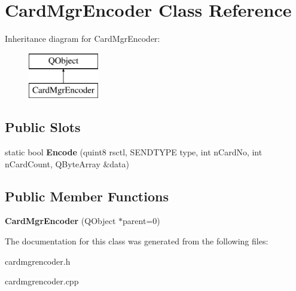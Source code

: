 \hypertarget{class_card_mgr_encoder}{\section{Card\-Mgr\-Encoder Class Reference}
\label{class_card_mgr_encoder}
}
Inheritance diagram for Card\-Mgr\-Encoder\-:\begin{figure}[H]
\begin{center}
\leavevmode
\includegraphics[height=2.000000cm]{class_card_mgr_encoder}
\end{center}
\end{figure}
\subsection*{Public Slots}
\begin{DoxyCompactItemize}
\item 
\hypertarget{class_card_mgr_encoder_a85a8efd0661a4f56c72ceca9a6aa505c}{static bool {\bfseries Encode} (quint8 rsctl, S\-E\-N\-D\-T\-Y\-P\-E type, int n\-Card\-No, int n\-Card\-Count, Q\-Byte\-Array \&data)}\label{class_card_mgr_encoder_a85a8efd0661a4f56c72ceca9a6aa505c}

\end{DoxyCompactItemize}
\subsection*{Public Member Functions}
\begin{DoxyCompactItemize}
\item 
\hypertarget{class_card_mgr_encoder_a76744be609a1f9b2c01d4401f6e2de41}{{\bfseries Card\-Mgr\-Encoder} (Q\-Object $\ast$parent=0)}\label{class_card_mgr_encoder_a76744be609a1f9b2c01d4401f6e2de41}

\end{DoxyCompactItemize}


The documentation for this class was generated from the following files\-:\begin{DoxyCompactItemize}
\item 
cardmgrencoder.\-h\item 
cardmgrencoder.\-cpp\end{DoxyCompactItemize}
